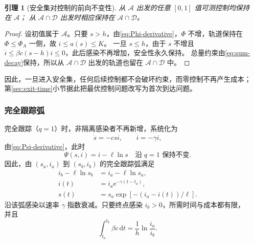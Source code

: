 \documentclass[11pt,a4paper,UTF8]{ctexart}
\newtheorem{lemma}[theorem]{引理}
\theoremstyle{definition}
\newcommand{\Acal}{\mathcal A}
\newcommand{\Dcal}{\mathcal D}
\newcommand{\dd}{\,\mathrm d}
\newcommand{\e}{\mathrm e}
\begin{document}
\begin{lemma}[安全集对控制的前向不变性]
\label{lem:safe-invariant}
从 $\Acal$ 出发的任意 $[0,1]$ 值可测控制均保持在 $\Acal$；
从 $\Acal\cap\Dcal$ 出发时相应保持在 $\Acal\cap\Dcal$。
\end{lemma}
\begin{proof}
设初值属于 $\Acal$。只要 $s>h$，由\eqref{eq:Phi-derivative}，$\Phi$ 不增，轨道保持在 $\Phi\le\Phi_A$ 一侧，故 $i\le a(s)\le K$。
一旦 $s\le h$，由于 $s$ 不增且 $\dot i\le \beta c(s-h)i\le0$，此后感染不再增加，安全性永久保持。
总量约束由\eqref{eq:sum-decay}保持，所以从 $\Acal\cap\Dcal$ 出发的轨道也留在 $\Acal\cap\Dcal$ 中。
\end{proof}
因此，一旦进入安全集，任何后续控制都不会破坏约束，而零控制不再产生成本；第\ref{sec:exit-time}小节据此把最优控制问题改写为首次到达问题。

\subsubsection{完全跟踪弧}
完全跟踪（$q=1$）时，非隔离感染者不再新增，系统化为
\begin{equation}
\dot s=-csi,\qquad \dot i=-\gamma i,
\label{eq:q1-system}
\end{equation}
由\eqref{eq:Psi-derivative}，此时
\begin{equation}
\boxed{\Psi(s,i)=i-\ell\ln s\quad\text{沿 }q=1\text{ 保持不变}.}
\label{eq:Psi}
\end{equation}
因此，由 $(s_a,i_a)$ 到 $(s_b,i_b)$ 的完全跟踪弧满足
\begin{align}
i_b-\ell\ln s_b&=i_a-\ell\ln s_a,
\label{eq:q1-characteristic}\\
i(t)&=i_a\e^{-\gamma(t-t_a)},
\label{eq:q1-i}\\
s(t)&=s_a\exp[-(i_a-i(t))/\ell].
\label{eq:q1-s}
\end{align}
沿该弧感染以速率 $\gamma$ 指数衰减。只要终点感染 $i_b>0$，所需时间与成本都有限，并且
\begin{equation}
\int_{t_a}^{t_b}\beta c\dd t=\frac1h\ln\frac{i_a}{i_b}.
\label{eq:q1-cost}
\end{equation}
\end{document}
